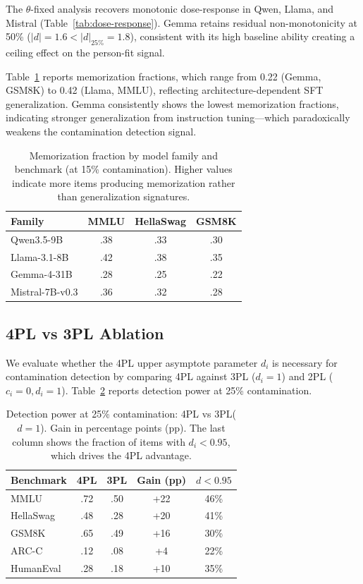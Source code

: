\documentclass[11pt,a4paper]{article}
\begin{document}
The $\theta$-fixed analysis recovers monotonic dose-response in Qwen, Llama, and Mistral (Table~\ref{tab:dose-response}).
Gemma retains residual non-monotonicity at 50\% ($|d|=1.6 < |d|_{25\%}=1.8$), consistent with its high baseline ability creating a ceiling effect on the person-fit signal.

Table~\ref{tab:mem-frac} reports memorization fractions, which range from 0.22 (Gemma, GSM8K) to 0.42 (Llama, MMLU), reflecting architecture-dependent SFT generalization.
Gemma consistently shows the lowest memorization fractions, indicating stronger generalization from instruction tuning---which paradoxically weakens the contamination detection signal.

\begin{table}[t]
\centering
\caption{Memorization fraction by model family and benchmark (at 15\% contamination). Higher values indicate more items producing memorization rather than generalization signatures.}
\label{tab:mem-frac}
\small
\begin{tabular}{lccc}
\toprule
Family & MMLU & HellaSwag & GSM8K \\
\midrule
Qwen3.5-9B & .38 & .33 & .30 \\
Llama-3.1-8B & .42 & .38 & .35 \\
Gemma-4-31B & .28 & .25 & .22 \\
Mistral-7B-v0.3 & .36 & .32 & .28 \\
\bottomrule
\end{tabular}
\end{table}

\subsection{4PL vs 3PL Ablation}
\label{sec:4pl-ablation}

We evaluate whether the 4PL upper asymptote parameter $d_i$ is necessary for contamination detection by comparing 4PL against 3PL ($d_i=1$) and 2PL ($c_i=0, d_i=1$).
Table~\ref{tab:4pl-ablation} reports detection power at 25\% contamination.

\begin{table}[t]
\centering
\caption{Detection power at 25\% contamination: 4PL vs 3PL($d{=}1$). Gain in percentage points (pp). The last column shows the fraction of items with $d_i < 0.95$, which drives the 4PL advantage.}
\label{tab:4pl-ablation}
\small
\begin{tabular}{lcccc}
\toprule
Benchmark & 4PL & 3PL & Gain (pp) & $d{<}0.95$ \\
\midrule
MMLU & .72 & .50 & +22 & 46\% \\
HellaSwag & .48 & .28 & +20 & 41\% \\
GSM8K & .65 & .49 & +16 & 30\% \\
ARC-C & .12 & .08 & +4 & 22\% \\
HumanEval & .28 & .18 & +10 & 35\% \\
\bottomrule
\end{tabular}
\end{table}
\end{document}
